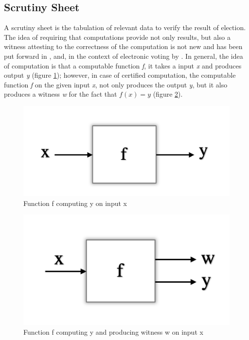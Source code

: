    \subsection{Scrutiny Sheet}
   \label{sec:scruntiny_sheet}
   A scrutiny sheet is the tabulation of relevant data to verify the result of election. 
   The idea of requiring that computations provide not only results, but also a witness attesting
    to the correctness of the computation is not new
	and has been put forward in \citep{89397}
	\citep{MCCONNELL2011119}
	\citep{Arkoudas:2005:DRC}, and, in the context of electronic voting by  \citep{Schurmann:2009:EET} \citep{Pattinson:2015:VCM}.
	 In general, the idea of computation is that a computable function \textit{f}, it takes 
	a input \textit{x} and produces output \textit{y} (figure \ref{fig:fnxy}); however, in case of
	 certified computation, 
	the computable function \textit{f} on the given input \textit{x}, not only produces the output \textit{y},
	but it also produces a witness \textit{w} for the fact that $ f (x) = y$ (figure \ref{fig:fnxyw}).
	
	\begin{figure}[!h]
	\centering
  \includegraphics[width=0.5\linewidth]{figs/function_fx.png}
  \caption{Function f computing y on input x}
  \label{fig:fnxy}
  \end{figure} 
  
  \begin{figure}[!h]
  \centering
  \includegraphics[width=0.5\linewidth]{figs/funcxy.png}
  \caption{Function f computing y and producing witness w on input x}
  \label{fig:fnxyw}
  \end{figure} 




